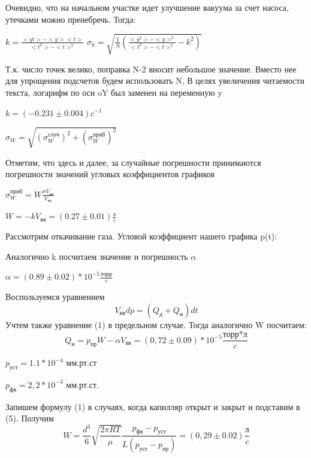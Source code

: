 \documentclass[12pt,a4paper]{article}
\begin{document}
\begin{enumerate}
Очевидно, что на начальном участке идет улучшение вакуума за счет насоса, утечками можно пренебречь. Тогда:

$k=\frac{<yt>-<y><t>}{<t^2>-<t>^2}$ \;\;\;\;\;\;\; $\sigma_{k}=\sqrt{\frac{1}{N}(\frac{<{y}^2>-<y>^2}{<t^2>-<t>^2}-{k}^2)}$

Т.к. число точек велико, поправка N-2 вносит небольшое значение. Вместо нее для упрощения подсчетов будем использовать N, В целях увеличения читаемости текста, логарифм по оси oY был заменен на переменную y

$k = (-0.231 \pm 0.004)c^{-1}$

$\sigma_{W}=\sqrt{(\sigma^{\text{случ}}_{W})^2+(\sigma^{\text{приб}}_{W})^2}$

Отметим, что здесь и далее, за случайные погрешности принимаются погрешности значений угловых коэффициентов графиков

$\sigma^{\text{приб}}_{W} = W\frac{\sigma{V_{\text{вв}}}}{V_{\text{вв}}}$

$W = -kV_{\text{вв}} = (0.27 \pm 0.01) \frac{\text{л}}{c}$


Рассмотрим откачивание газа. Угловой коэффициент нашего графика p(t):

Аналогично k посчитаем значение и погрешность $\alpha$

$\alpha = (0.89 \pm 0.02)*10^{-5} \frac{\text{торр}}{c}$

 Воспользуемся уравнением
\begin{equation}
V_{\text{вв}}dp = (Q_{\text{д}} + Q_{\text{и}})dt
\end{equation}
Учтем также уравнение (1) в предельном случае. Тогда аналогично W посчитаем:
\begin{equation}
Q_{\text{и}} = p_{\text{пр}}W - \alpha{V_{\text{вв}}} = (0,72 \pm 0.09)*10^{-5} \frac{\text{торр*л}}{c}
\end{equation}

$p_{\text{уст}} = 1.1*10^{-4}$ мм.рт.ст

$p_{\text{фв}} = 2,2 * 10^{-3}$ мм.рт.ст.

Запишем формулу (1) в случаях, когда капилляр открыт и закрыт и подставим в (5). Получим
\begin{equation}
W =  \frac{d^3}{6}\sqrt{\frac{2\pi{RT}}{\mu}}\frac{p_{\text{фв}}-p_{\text{уст}}}{L(p_{\text{уст}}-p_{\text{пр}})} = (0,29 \pm 0.02)\frac{\text{л}}{c}
\end{equation}

\end{enumerate}
\end{document}
